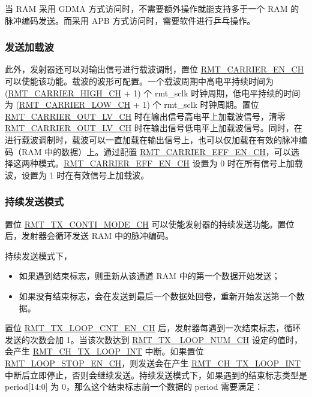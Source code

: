 \documentclass[main\_\_CN.tex]{subfiles}
\begin{document}
\begin{tiplisting}
当 RAM 采用 GDMA 方式访问时，不需要额外操作就能支持多于一个 RAM 的脉冲编码发送。而采用 APB 方式访问时，需要软件进行乒乓操作。
\end{tiplisting}

\subsubsection{发送加载波}

此外，发射器还可以对输出信号进行载波调制，置位 \hyperref[fielddesc:RMTCARRIERENCHN]{RMT\_CARRIER\_EN\_CH} 可以使能该功能。载波的波形可配置。一个载波周期中高电平持续时间为 (\hyperref[fielddesc:RMTCARRIERHIGHCHN]{RMT\_CARRIER\_HIGH\_CH} + 1) 个 rmt\_sclk 时钟周期，低电平持续的时间为 (\hyperref[fielddesc:RMTCARRIERLOWCHN]{RMT\_CARRIER\_LOW\_CH} + 1) 个 rmt\_sclk 时钟周期。置位 \hyperref[fielddesc:RMTCARRIEROUTLVCHN]{RMT\_CARRIER\_OUT\_LV\_CH} 时在输出信号高电平上加载波信号，清零 \hyperref[fielddesc:RMTCARRIEROUTLVCHN]{RMT\_CARRIER\_OUT\_LV\_CH} 时在输出信号低电平上加载波信号。同时，在进行载波调制时，载波可以一直加载在输出信号上，也可以仅加载在有效的脉冲编码（RAM 中的数据）上。通过配置 \hyperref[fielddesc:RMTCARRIEREFFENCHN]{RMT\_CARRIER\_EFF\_EN\_CH}，可以选择这两种模式。\hyperref[fielddesc:RMTCARRIEREFFENCHN]{RMT\_CARRIER\_EFF\_EN\_CH} 设置为 0 时在所有信号上加载波，设置为 1 时在有效信号上加载波。


\subsubsection{持续发送模式}


置位 \hyperref[fielddesc:RMTTXCONTIMODECHN]{RMT\_TX\_CONTI\_MODE\_CH} 可以使能发射器的持续发送功能。置位后，发射器会循环发送 RAM 中的脉冲编码。

持续发送模式下，
\begin{itemize}
    \item 如果遇到结束标志，则重新从该通道 RAM 中的第一个数据开始发送；
    \item 如果没有结束标志，会在发送到最后一个数据处回卷，重新开始发送第一个数据。
\end{itemize}

置位 \hyperref[fielddesc:RMTTXLOOPCNTENCHN]{RMT\_TX\_LOOP\_CNT\_EN\_CH} 后，发射器每遇到一次结束标志，循环发送的次数会加 1。当该次数达到 \hyperref[fielddesc:RMTTXLOOPNUMCHN]{RMT\_TX \_LOOP\_NUM\_CH} 设定的值时，会产生 \hyperref[int:RMTCHNTXLOOPINT]{RMT\_CH\_TX\_LOOP\_INT} 中断。如果置位 \hyperref[fielddesc:RMTLOOPSTOPENCHN]{RMT\_LOOP\_STOP\_EN\_CH}，则发送会在产生 \hyperref[int:RMTCHNTXLOOPINT]{RMT\_CH\_TX\_LOOP\_INT} 中断后立即停止，否则会继续发送。持续发送模式下，如果遇到的结束标志类型是 period[14:0] 为 0，那么这个结束标志前一个数据的 period 需要满足：
\end{document}
